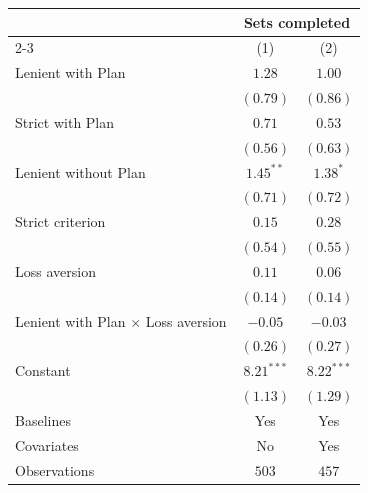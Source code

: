 \begin{tabular}{l c c}
\toprule
 & \multicolumn{2}{c}{Sets completed} \\
\cmidrule(lr){2-3}
 & (1) & (2) \\
\midrule
Lenient with Plan                        & $1.28$       & $1.00$       \\
                                         & $(0.79)$     & $(0.86)$     \\
Strict with Plan                         & $0.71$       & $0.53$       \\
                                         & $(0.56)$     & $(0.63)$     \\
Lenient without Plan                     & $1.45^{**}$  & $1.38^{*}$   \\
                                         & $(0.71)$     & $(0.72)$     \\
Strict criterion                         & $0.15$       & $0.28$       \\
                                         & $(0.54)$     & $(0.55)$     \\
Loss aversion                            & $0.11$       & $0.06$       \\
                                         & $(0.14)$     & $(0.14)$     \\
Lenient with Plan $\times$ Loss aversion & $-0.05$      & $-0.03$      \\
                                         & $(0.26)$     & $(0.27)$     \\
Constant                                 & $8.21^{***}$ & $8.22^{***}$ \\
                                         & $(1.13)$     & $(1.29)$     \\
\midrule
Baselines                                & Yes          & Yes          \\
Covariates                               & No           & Yes          \\
Observations                                & $503$        & $457$        \\
\bottomrule
\end{tabular}
